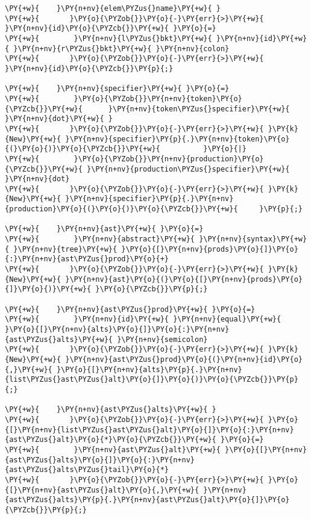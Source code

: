 \begin{Verbatim}[commandchars=\\\{\}]
\PY{+w}{    }\PY{n+nv}{elem\PYZus{}name}\PY{+w}{ }
\PY{+w}{	   }\PY{o}{\PYZob{}}\PY{o}{-}\PY{err}{>}\PY{+w}{ }\PY{n+nv}{id}\PY{o}{\PYZcb{}}\PY{+w}{ }\PY{o}{=}
\PY{+w}{        }\PY{n+nv}{l\PYZus{}bkt}\PY{+w}{ }\PY{n+nv}{id}\PY{+w}{ }\PY{n+nv}{r\PYZus{}bkt}\PY{+w}{ }\PY{n+nv}{colon}
\PY{+w}{	   }\PY{o}{\PYZob{}}\PY{o}{-}\PY{err}{>}\PY{+w}{ }\PY{n+nv}{id}\PY{o}{\PYZcb{}}\PY{p}{;}

\PY{+w}{    }\PY{n+nv}{specifier}\PY{+w}{ }\PY{o}{=}
\PY{+w}{        }\PY{o}{\PYZob{}}\PY{n+nv}{token}\PY{o}{\PYZcb{}}\PY{+w}{      }\PY{n+nv}{token\PYZus{}specifier}\PY{+w}{ }\PY{n+nv}{dot}\PY{+w}{ }
\PY{+w}{	   }\PY{o}{\PYZob{}}\PY{o}{-}\PY{err}{>}\PY{+w}{ }\PY{k}{New}\PY{+w}{ }\PY{n+nv}{specifier}\PY{p}{.}\PY{n+nv}{token}\PY{o}{(}\PY{o}{)}\PY{o}{\PYZcb{}}\PY{+w}{ 			}\PY{o}{|}
\PY{+w}{        }\PY{o}{\PYZob{}}\PY{n+nv}{production}\PY{o}{\PYZcb{}}\PY{+w}{ }\PY{n+nv}{production\PYZus{}specifier}\PY{+w}{ }\PY{n+nv}{dot}
\PY{+w}{	   }\PY{o}{\PYZob{}}\PY{o}{-}\PY{err}{>}\PY{+w}{ }\PY{k}{New}\PY{+w}{ }\PY{n+nv}{specifier}\PY{p}{.}\PY{n+nv}{production}\PY{o}{(}\PY{o}{)}\PY{o}{\PYZcb{}}\PY{+w}{		}\PY{p}{;}

\PY{+w}{    }\PY{n+nv}{ast}\PY{+w}{ }\PY{o}{=}
\PY{+w}{        }\PY{n+nv}{abstract}\PY{+w}{ }\PY{n+nv}{syntax}\PY{+w}{ }\PY{n+nv}{tree}\PY{+w}{ }\PY{o}{[}\PY{n+nv}{prods}\PY{o}{]}\PY{o}{:}\PY{n+nv}{ast\PYZus{}prod}\PY{o}{+}
\PY{+w}{	   }\PY{o}{\PYZob{}}\PY{o}{-}\PY{err}{>}\PY{+w}{ }\PY{k}{New}\PY{+w}{ }\PY{n+nv}{ast}\PY{o}{(}\PY{o}{[}\PY{n+nv}{prods}\PY{o}{]}\PY{o}{)}\PY{+w}{ }\PY{o}{\PYZcb{}}\PY{p}{;}

\PY{+w}{    }\PY{n+nv}{ast\PYZus{}prod}\PY{+w}{ }\PY{o}{=}
\PY{+w}{        }\PY{n+nv}{id}\PY{+w}{ }\PY{n+nv}{equal}\PY{+w}{ }\PY{o}{[}\PY{n+nv}{alts}\PY{o}{]}\PY{o}{:}\PY{n+nv}{ast\PYZus{}alts}\PY{+w}{ }\PY{n+nv}{semicolon}
\PY{+w}{	   }\PY{o}{\PYZob{}}\PY{o}{-}\PY{err}{>}\PY{+w}{ }\PY{k}{New}\PY{+w}{ }\PY{n+nv}{ast\PYZus{}prod}\PY{o}{(}\PY{n+nv}{id}\PY{o}{,}\PY{+w}{ }\PY{o}{[}\PY{n+nv}{alts}\PY{p}{.}\PY{n+nv}{list\PYZus{}ast\PYZus{}alt}\PY{o}{]}\PY{o}{)}\PY{o}{\PYZcb{}}\PY{p}{;}

\PY{+w}{    }\PY{n+nv}{ast\PYZus{}alts}\PY{+w}{ }
\PY{+w}{	   }\PY{o}{\PYZob{}}\PY{o}{-}\PY{err}{>}\PY{+w}{ }\PY{o}{[}\PY{n+nv}{list\PYZus{}ast\PYZus{}alt}\PY{o}{]}\PY{o}{:}\PY{n+nv}{ast\PYZus{}alt}\PY{o}{*}\PY{o}{\PYZcb{}}\PY{+w}{ }\PY{o}{=}
\PY{+w}{        }\PY{n+nv}{ast\PYZus{}alt}\PY{+w}{ }\PY{o}{[}\PY{n+nv}{ast\PYZus{}alts}\PY{o}{]}\PY{o}{:}\PY{n+nv}{ast\PYZus{}alts\PYZus{}tail}\PY{o}{*}
\PY{+w}{	   }\PY{o}{\PYZob{}}\PY{o}{-}\PY{err}{>}\PY{+w}{ }\PY{o}{[}\PY{n+nv}{ast\PYZus{}alt}\PY{o}{,}\PY{+w}{ }\PY{n+nv}{ast\PYZus{}alts}\PY{p}{.}\PY{n+nv}{ast\PYZus{}alt}\PY{o}{]}\PY{o}{\PYZcb{}}\PY{p}{;}


\end{Verbatim}

